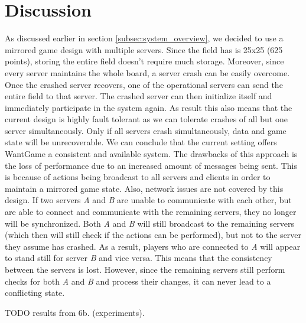 \section{Discussion}


	As discussed earlier in section \ref{subsec:system_overview}, we decided to use a mirrored game design with multiple servers. 
	Since the field has is 25x25 (625 points), storing the entire field doesn't require much storage. 
	Moreover, since every server maintains the whole board, a server crash can be easily overcome.
	Once the crashed server recovers, one of the operational servers can send the entire field to that server. 
	The crashed server can then initialize itself and immediately participate in the system again. 
	As result this also means that the current design is highly fault tolerant as we can tolerate crashes of all but one server simultaneously. 
	Only if all servers crash simultaneously, data and game state will be unrecoverable.
	We can conclude that the current setting offers WantGame a consistent and available system. 
	The drawbacks of this approach is the loss of performance due to an increased amount of messages being sent. 
	This is because of actions being broadcast to all servers and clients in order to maintain a mirrored game state. 
	Also, network issues are not covered by this design. 
	If two servers \emph{A} and \emph{B} are unable to communicate with each other, but are able to connect and communicate with the remaining servers, they no longer will be synchronized. 
	Both \emph{A} and \emph{B} will still broadcast to the remaining servers (which then will still check if the actions can be performed), but not to the server they assume has crashed. 
	As a result, players who are connected to \emph{A} will appear to stand still for server \emph{B} and vice versa. This means that the consistency between the servers is lost. However, since the remaining servers still perform checks for both \emph{A} and \emph{B} and process their changes, it can never lead to a conflicting state.
	
	TODO results from 6b. (experiments).
